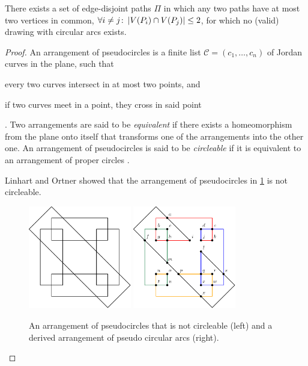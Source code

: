 \clearpage

\begin{theorem}
\label{thm:necessary-condition-not-sufficient}
There exists a set of edge-disjoint paths ${\Pi}$ in which any two paths have at most two vertices in common, \ie{} ${\forall i \neq j \colon \left\lvert V(P_i) \cap V(P_j)\right\rvert \leq 2}$, for which no (valid) drawing with circular arcs exists.
\end{theorem}

\begin{proof}
An arrangement of pseudocircles is a finite list ${\mathcal{C} = (c_1, \ldots, c_n)}$ of Jordan curves in the plane, such that \begin{enumerate*}[label=(\roman*)] \item every two curves intersect in at most two points, and \item if two curves meet in a point, they cross in said point \end{enumerate*}. Two arrangements are said to be \emph{equivalent} if there exists a homeomorphism from the plane onto itself that transforms one of the arrangements into the other one. An arrangement of pseudocircles is said to be \emph{circleable} if it is equivalent to an arrangement of proper circles \cite{Kang}.

Linhart and Ortner \cite{Linhart} showed that the arrangement of pseudocircles in \cref{fig:non-circleable-arrangement-of-pseudocircles} is not circleable.

\begin{figure}[H]
  \centering
  \includegraphics[width=0.4\textwidth]{Resources/Figures/Arrangement-of-Pseudocircles.pdf}
  \quad
  \includegraphics[width=0.4\textwidth]{Resources/Figures/Arrangement-of-Pseudoarcs.pdf}
  \caption{An arrangement of pseudocircles that is not circleable (left) and a derived arrangement of pseudo circular arcs (right).}
  \label{fig:non-circleable-arrangement-of-pseudocircles}
\end{figure}


\end{proof}
